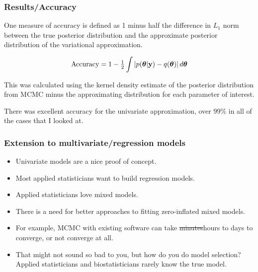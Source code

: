 \documentclass{beamer}
\begin{document}
\begin{frame}
\frametitle{Results/Accuracy}
One measure of accuracy is defined as 1 minus half the difference in $L_1$ norm between the
true posterior distribution and the approximate posterior distribution of the
variational approximation.

$$
\text{Accuracy} = 1 - \tfrac{1}{2} \int \left |p({\boldsymbol \theta}|{\bf y}) - q({\boldsymbol \theta}) \right | d {\boldsymbol \theta}
$$

This was calculated using the kernel density estimate of the posterior
distribution from MCMC minus the approximating distribution for each parameter of
interest.

\bigskip 
There was excellent accuracy for the univariate approximation, over 99\% in all of the cases that I looked at.
\end{frame}

\begin{frame}
\frametitle{Extension to multivariate/regression models}
\begin{itemize}
\item Univariate models are a nice proof of concept.
\item Most applied statisticians want to build regression models.
\item Applied statisticians love mixed models.
\item There is a need for better approaches to fitting zero-inflated mixed models.
\item For example, MCMC with existing software can take \sout{minutes}hours 
to days to converge, or not converge at all.
\item That might not sound so bad to you, but how do you
do model selection? Applied statisticians and biostatisticians rarely know the true model.
\end{itemize}
\end{frame}
\end{document}
